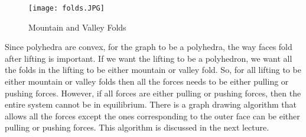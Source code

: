 \documentclass{article}
\begin{document}
    \begin{figure}[H]
        \centering
        \texttt{[image: folds.JPG]}
        \caption{Mountain and Valley Folds}
        \label{fig:folds}
    \end{figure}
    
    
    Since polyhedra are convex, for the graph to be a polyhedra, the way faces fold after lifting is important. If we want the lifting to be a polyhedron, we want all the folds in the lifting to be either mountain or valley fold. So, for all lifting to be either mountain or valley folds then all the forces needs to be either pulling or pushing forces. However, if all forces are either pulling or pushing forces, then the entire system cannot be in equilibrium. There is a graph drawing algorithm that allows all the forces except the ones corresponding to the outer face can be either pulling or pushing forces. This algorithm is discussed in the next lecture.
    
    
    
    
    
    
\end{document}
